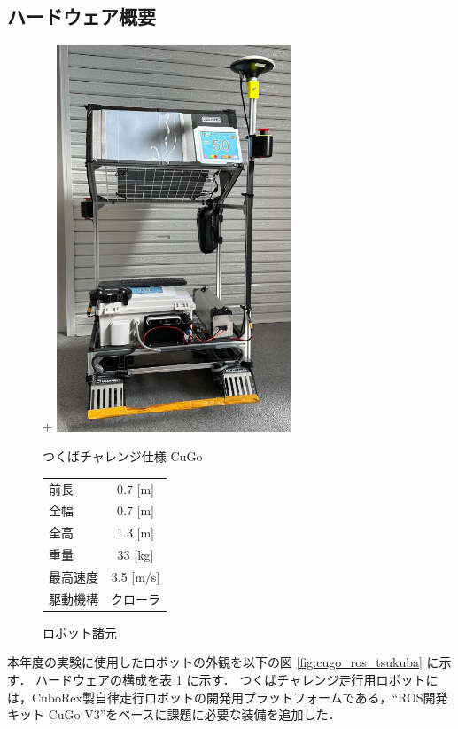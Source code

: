 \documentclass[platex,dvipdfmx]{rbproceedings}
\begin{document}
\subsection{ハードウェア概要}
\begin{figure}[htbp]
    \centering
    \begin{minipage}[b]{0.45\linewidth}
        \centering
+        \includegraphics[keepaspectratio,width=70mm]{fig/cugo_tsukuba.png}
        \caption{つくばチャレンジ仕様 CuGo}
        \label{fig:cugo_ros_tsukuba}
    \end{minipage}
    \begin{minipage}[b]{0.45\linewidth}
        \centering
        \caption{ロボット諸元}
        \label{tab:cugo_ros_tsukuba_spec}
        \begin{tabular}{lc}
            \hline
            前長     & 0.7 [m] \\
            全幅     & 0.7 [m] \\
            全高     & 1.3 [m] \\
            重量     & 33  [kg] \\
            最高速度 & 3.5 [m/s] \\
            駆動機構 & クローラ \\
            \hline
        \end{tabular}
    \end{minipage}
\end{figure}

本年度の実験に使用したロボットの外観を以下の図 \ref{fig:cugo_ros_tsukuba} に示す．
ハードウェアの構成を表 \ref{tab:cugo_ros_tsukuba_spec} に示す．
つくばチャレンジ走行用ロボットには，CuboRex製自律走行ロボットの開発用プラットフォームである，“ROS開発キット CuGo V3”をベースに課題に必要な装備を追加した．
\end{document}
